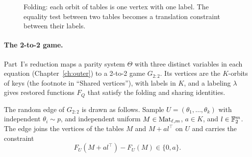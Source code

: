 \begin{figure}[ht]
\centering
{}
\caption{Folding: each orbit of tables is one vertex with one label. The equality test between two tables becomes a translation constraint between their labels.}\label{fig:folding}
\end{figure}

\paragraph{The 2-to-2 game.} Part~I's reduction maps a parity system $\Theta$ with three distinct variables in each equation (Chapter~\ref{ch:outer}) to a 2-to-2 game $G_{2:2}$. Its vertices are the $K$-orbits of keys (the footnote in ``Shared vertices''), with labels in $K$, and a labeling $\lambda$ gives restored functions $F_Q$ that satisfy the folding and sharing identities.

\begin{definition}\label{def:G22}
The random edge of $G_{2:2}$ is drawn as follows. Sample $U=(\theta_1,\dots,\theta_k)$ with independent $\theta_i\sim p$, and independent uniform $M\in\operatorname{Mat}_{\ell,m}$, $a\in K$, and $l\in\mathbb{F}_2^m$. The edge joins the vertices of the tables $M$ and $M+al^\top$ on $U$ and carries the constraint
\[
F_U(M+al^\top)-F_U(M)\in\{0,a\}.
\]
\end{definition}


